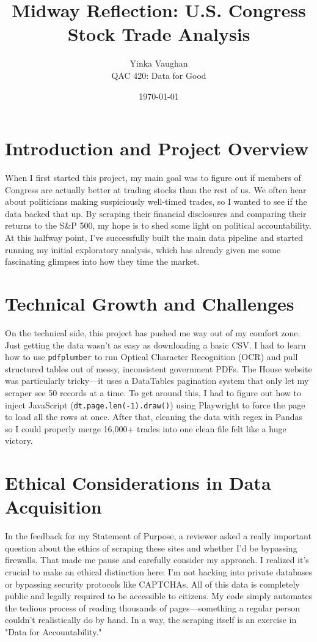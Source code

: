 \documentclass[12pt]{article}
\title{Midway Reflection: U.S. Congress Stock Trade Analysis}
\author{Yinka Vaughan \\ QAC 420: Data for Good}
\date{\today}
\begin{document}
\maketitle
\doublespacing

\section*{Introduction and Project Overview}
When I first started this project, my main goal was to figure out if members of Congress are actually better at trading stocks than the rest of us. We often hear about politicians making suspiciously well-timed trades, so I wanted to see if the data backed that up. By scraping their financial disclosures and comparing their returns to the S\&P 500, my hope is to shed some light on political accountability. At this halfway point, I've successfully built the main data pipeline and started running my initial exploratory analysis, which has already given me some fascinating glimpses into how they time the market.

\section*{Technical Growth and Challenges}
On the technical side, this project has pushed me way out of my comfort zone. Just getting the data wasn't as easy as downloading a basic CSV. I had to learn how to use \texttt{pdfplumber} to run Optical Character Recognition (OCR) and pull structured tables out of messy, inconsistent government PDFs. The House website was particularly tricky—it uses a DataTables pagination system that only let my scraper see 50 records at a time. To get around this, I had to figure out how to inject JavaScript (\texttt{dt.page.len(-1).draw()}) using Playwright to force the page to load all the rows at once. After that, cleaning the data with regex in Pandas so I could properly merge 16,000+ trades into one clean file felt like a huge victory.

\section*{Ethical Considerations in Data Acquisition}
In the feedback for my Statement of Purpose, a reviewer asked a really important question about the ethics of scraping these sites and whether I'd be bypassing firewalls. That made me pause and carefully consider my approach. I realized it's crucial to make an ethical distinction here: I'm not hacking into private databases or bypassing security protocols like CAPTCHAs. All of this data is completely public and legally required to be accessible to citizens. My code simply automates the tedious process of reading thousands of pages—something a regular person couldn't realistically do by hand. In a way, the scraping itself is an exercise in "Data for Accountability."
\end{document}
